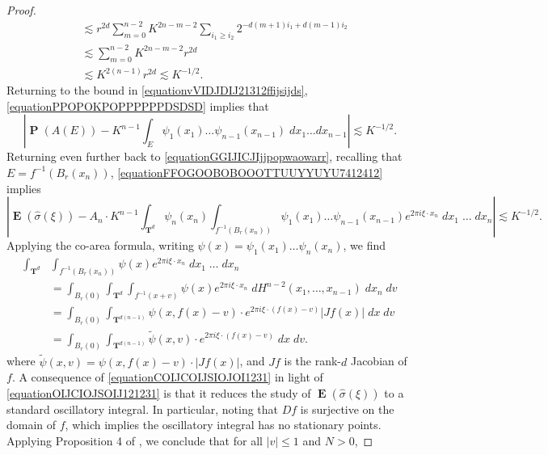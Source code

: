 \documentclass[dvipsnames,letterpaper,12pt]{article}
\numberwithin{equation}{section}
\DeclareMathOperator{\TT}{\mathbf{T}}
\numberwithin{theorem}{section}
\DeclareMathOperator{\EE}{\mathbf{E}}
\DeclareMathOperator{\PP}{\mathbf{P}}
\begin{document}
\begin{proof}
\begin{equation}
\begin{split}
        &\lesssim r^{2d} \sum_{m = 0}^{n-2} K^{2n-m-2} \sum_{i_1 \geq i_2} 2^{-d(m+1)i_1 + d(m-1)i_2}\\
        &\lesssim \sum_{m = 0}^{n-2} K^{2n-m-2} r^{2d}\\
        &\lesssim K^{2(n-1)} r^{2d} \lesssim K^{-1/2}.
    \end{split}
    \end{equation}
    Returning to the bound in \eqref{equationvVIDJDIJ21312ffijsijds}, \eqref{equationPPOPOKPOPPPPPPDSDSD} implies that
    \begin{equation} \label{equationFFOGOOBOBOOOTTUUYYUYU7412412}
        \left| \PP(A(E)) - K^{n-1} \int_E \psi_1(x_1) \dots \psi_{n-1}(x_{n-1})\; dx_1 \dots dx_{n-1} \right| \lesssim K^{-1/2}.
    \end{equation}
    Returning even further back to \eqref{equationGGIJICJIjjpopwaowarr}, recalling that $E = f^{-1}(B_r(x_n))$, \eqref{equationFFOGOOBOBOOOTTUUYYUYU7412412} implies
    \begin{equation} \label{equationOIJCIOJSOIJ121231}
        \left| \EE(\widehat{\sigma}(\xi)) - A_n \cdot K^{n-1} \int_{\TT^d} \psi_n(x_n) \int_{f^{-1}(B_r(x_n))} \psi_1(x_1) \dots \psi_{n-1}(x_{n-1}) e^{2 \pi i \xi \cdot x_n}\; dx_1\; \dots\; dx_n \right| \lesssim K^{-1/2}.
    \end{equation}
    Applying the co-area formula, writing $\psi(x) = \psi_1(x_1) \dots \psi_n(x_n)$, we find
    \begin{equation} \label{equationCOIJCOIJSIOJOI1231}
    \begin{split}
        \int_{\TT^d} & \int_{f^{-1}(B_r(x_n))} \psi(x) e^{2 \pi i \xi \cdot x_n}\; dx_1\; \dots\; dx_n\\
        &= \int_{B_r(0)} \int_{\TT^d} \int_{f^{-1}(x + v)} \psi(x) e^{2 \pi i \xi \cdot x_n}\; dH^{n-2}(x_1,\dots,x_{n-1})\; dx_n\; dv\\
        &= \int_{B_r(0)} \int_{\TT^{d(n-1)}} \psi(x,f(x) - v) \cdot e^{2 \pi i \xi \cdot (f(x) - v)} |Jf(x)|\; dx\; dv\\
        &= \int_{B_r(0)} \int_{\TT^{d(n-1)}} \tilde{\psi}(x,v) \cdot e^{2 \pi i \xi \cdot (f(x) - v)}\; dx\; dv.
    \end{split}
    \end{equation}
    where $\tilde{\psi}(x,v) = \psi(x,f(x) - v) \cdot |Jf(x)|$, and $Jf$ is the rank-$d$ Jacobian of $f$. A consequence of \eqref{equationCOIJCOIJSIOJOI1231} in light of \eqref{equationOIJCIOJSOIJ121231} is that it reduces the study of $\EE(\widehat{\sigma}(\xi))$ to a standard oscillatory integral. In particular, noting that $Df$ is surjective on the domain of $f$, which implies the oscillatory integral has no stationary points. Applying Proposition 4 of \cite{Stein}, we conclude that for all $|v| \leq 1$ and $N > 0$,

\end{proof}
\end{document}
